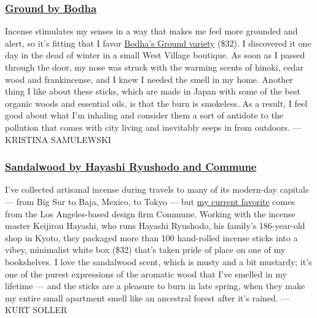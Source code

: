 \hypertarget{ground-by-bodha}{%
\subsubsection{\texorpdfstring{\textbf{\href{https://bodha.com/shop/ground-ritual-incense}{Ground
by Bodha}}}{Ground by Bodha}}\label{ground-by-bodha}}

Incense stimulates my senses in a way that makes me feel more grounded
and alert, so it's fitting that I favor
\href{https://bodha.com/shop/ground-ritual-incense}{Bodha's Ground
variety} (\$32). I discovered it one day in the dead of winter in a
small West Village boutique. As soon as I passed through the door, my
nose was struck with the warming scents of hinoki, cedar wood and
frankincense, and I knew I needed the smell in my home. Another thing I
like about these sticks, which are made in Japan with some of the best
organic woods and essential oils, is that the burn is smokeless. As a
result, I feel good about what I'm inhaling and consider them a sort of
antidote to the pollution that comes with city living and inevitably
seeps in from outdoors. --- KRISTINA SAMULEWSKI

\hypertarget{sandalwood-by-hayashi-ryushodo-and-commune}{%
\subsubsection{\texorpdfstring{\textbf{\href{https://www.communedesign.com/shop/objects/commune-incense-sticks-4405788377146/}{Sandalwood
by Hayashi Ryushodo and
Commune}}}{Sandalwood by Hayashi Ryushodo and Commune}}\label{sandalwood-by-hayashi-ryushodo-and-commune}}

I've collected artisanal incense during travels to many of its
modern-day capitals --- from Big Sur to Baja, Mexico, to Tokyo --- but
\href{https://www.communedesign.com/shop/objects/commune-incense-sticks-4405788377146/}{my
current favorite} comes from the Los Angeles-based design firm Commune.
Working with the incense master Keijirou Hayashi, who runs Hayashi
Ryushodo, his family's 186-year-old shop in Kyoto, they packaged more
than 100 hand-rolled incense sticks into a vibey, minimalist white box
(\$32) that's taken pride of place on one of my bookshelves. I love the
sandalwood scent, which is musty and a bit mustardy; it's one of the
purest expressions of the aromatic wood that I've smelled in my lifetime
--- and the sticks are a pleasure to burn in late spring, when they make
my entire small apartment smell like an ancestral forest after it's
rained. --- KURT SOLLER

